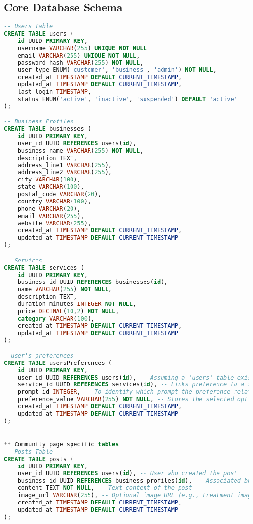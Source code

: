 \subsection{Core Database Schema}
\begin{lstlisting}[language=SQL]
-- Users Table
CREATE TABLE users (
    id UUID PRIMARY KEY,
    username VARCHAR(255) UNIQUE NOT NULL
    email VARCHAR(255) UNIQUE NOT NULL,
    password_hash VARCHAR(255) NOT NULL,
    user_type ENUM('customer', 'business', 'admin') NOT NULL,
    created_at TIMESTAMP DEFAULT CURRENT_TIMESTAMP,
    updated_at TIMESTAMP DEFAULT CURRENT_TIMESTAMP,
    last_login TIMESTAMP,
    status ENUM('active', 'inactive', 'suspended') DEFAULT 'active'
);

-- Business Profiles
CREATE TABLE businesses (
    id UUID PRIMARY KEY,
    user_id UUID REFERENCES users(id),
    business_name VARCHAR(255) NOT NULL,
    description TEXT,
    address_line1 VARCHAR(255),
    address_line2 VARCHAR(255),
    city VARCHAR(100),
    state VARCHAR(100),
    postal_code VARCHAR(20),
    country VARCHAR(100),
    phone VARCHAR(20),
    email VARCHAR(255),
    website VARCHAR(255),
    created_at TIMESTAMP DEFAULT CURRENT_TIMESTAMP,
    updated_at TIMESTAMP DEFAULT CURRENT_TIMESTAMP
);

-- Services
CREATE TABLE services (
    id UUID PRIMARY KEY,
    business_id UUID REFERENCES businesses(id),
    name VARCHAR(255) NOT NULL,
    description TEXT,
    duration_minutes INTEGER NOT NULL,
    price DECIMAL(10,2) NOT NULL,
    category VARCHAR(100),
    created_at TIMESTAMP DEFAULT CURRENT_TIMESTAMP,
    updated_at TIMESTAMP DEFAULT CURRENT_TIMESTAMP
);

--user's preferences 
CREATE TABLE usersPreferences (
    id UUID PRIMARY KEY,
    user_id UUID REFERENCES users(id), -- Assuming a 'users' table exists
    service_id UUID REFERENCES services(id), -- Links preference to a specific service (optional)
    prompt_id INTEGER, -- To identify which prompt the preference relates to (e.g., 1, 2, 3)
    preference_value VARCHAR(255) NOT NULL, -- Stores the selected option, e.g., 'Acne and Blemishes'
    created_at TIMESTAMP DEFAULT CURRENT_TIMESTAMP,
    updated_at TIMESTAMP DEFAULT CURRENT_TIMESTAMP
);


** Community page specific tables
-- Posts Table
CREATE TABLE posts (
    id UUID PRIMARY KEY,
    user_id UUID REFERENCES users(id), -- User who created the post
    business_id UUID REFERENCES business_profiles(id), -- Associated business providing the treatment
    content TEXT NOT NULL, -- Text content of the post
    image_url VARCHAR(255), -- Optional image URL (e.g., treatment image)
    created_at TIMESTAMP DEFAULT CURRENT_TIMESTAMP,
    updated_at TIMESTAMP DEFAULT CURRENT_TIMESTAMP
);


\end{lstlisting}
